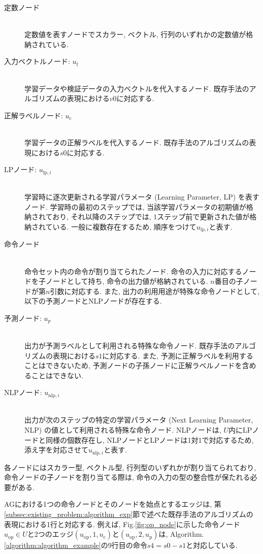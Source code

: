 \documentclass[a4paper,11pt,twocolumn]{jarticle}
\begin{document}
\begin{description}
  \item[定数ノード] \ \\ 定数値を表すノードでスカラー, ベクトル, 行列のいずれかの定数値が格納されている.
  \item[入力ベクトルノード: $u_\mathrm{f}$] \ \\ 学習データや検証データの入力ベクトルを代入するノード. 既存手法のアルゴリズムの表現における$v0$に対応する.
  \item[正解ラベルノード: $u_\mathrm{c}$] \ \\ 学習データの正解ラベルを代入するノード. 既存手法のアルゴリズムの表現における$s0$に対応する.
  \item[LPノード: $u_{\mathrm{lp},i}$] \ \\ 学習時に逐次更新される学習パラメータ (Learning Parameter, LP) を表すノード. 学習時の最初のステップでは, 当該学習パラメータの初期値が格納されており, それ以降のステップでは, 1ステップ前で更新された値が格納されている. 一般に複数存在するため, 順序をつけて$u_{\mathrm{lp},i}$と表す.
  \item[命令ノード] \ \\ 命令セット内の命令が割り当てられたノード. 命令の入力に対応するノードを子ノードとして持ち, 命令の出力値が格納されている. $n$番目の子ノードが第$n$引数に対応する. また, 出力の利用用途が特殊な命令ノードとして, 以下の予測ノードとNLPノードが存在する.
  \item[予測ノード: $u_{p}$] \ \\ 出力が予測ラベルとして利用される特殊な命令ノード. 既存手法のアルゴリズムの表現における$s1$に対応する. また, 予測に正解ラベルを利用することはできないため, 予測ノードの子孫ノードに正解ラベルノードを含めることはできない.
  \item[NLPノード: $u_{\mathrm{nlp},i}$] \ \\ 出力が次のステップの特定の学習パラメータ (Next Learning Parameter, NLP) の値として利用される特殊な命令ノード. NLPノードは, $U$内にLPノードと同様の個数存在し, NLPノードとLPノードは1対1で対応するため, 添え字を対応させて$u_{\mathrm{nlp},i}$と表す.
\end{description}
\noindent
各ノードにはスカラー型, ベクトル型, 行列型のいずれかが割り当てられており, 命令ノードの子ノードを割り当てる際は, 命令の入力の型の整合性が保たれる必要がある.

AGにおける1つの命令ノードとそのノードを始点とするエッジは, 第\ref{subsec:existing_problem:algorithm_exp}節で述べた既存手法のアルゴリズムの表現における1行と対応する. 例えば, Fig.\ref{fig:op_node}に示した命令ノード$u_\mathrm{op} \in U$と2つのエッジ$(u_\mathrm{op}, 1, u_\mathrm{c})$と$(u_\mathrm{op}, 2, u_\mathrm{p})$は, Algorithm.\ref{algorithm:algorithm_example}の9行目の命令$s4 = s0 - s1$と対応している.
\end{document}
